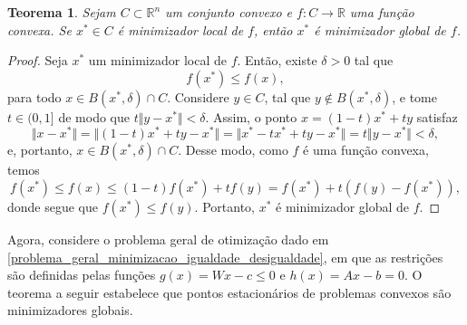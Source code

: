\documentclass[12pt,a4paper]{scrartcl}
\def\RR{\mathds{R}}
\newtheorem{teo}{Teorema}
\theoremstyle{definition}%
\begin{document}
\begin{teo} \label{teo:convexidade_e_minimizador}
Sejam $C \subset \RR^{n}$ um conjunto convexo e $f:C \rightarrow \RR$ uma função convexa. Se $x^{*} \in C$ é minimizador local de $f$, então $x^{*}$ é minimizador global de $f$.
\end{teo}
\begin{proof}
Seja $x^{*}$ um minimizador local de $f$. Então, existe $\delta > 0$ tal que 
\[
f(x^{*}) \leq f(x), 
\]
para todo $x \in B(x^{*}, \delta) \cap C$. Considere $y \in C$, tal que $y \notin B(x^{*}, \delta)$, e tome $t \in (0,1]$ de modo que $t \Vert y-x^{*} \Vert < \delta$. Assim, o ponto $x = (1-t)x^{*} + ty$ satisfaz
\[
\Vert x - x^{*} \Vert = \Vert (1-t)x^{*} + ty - x^{*} \Vert = \Vert x^{*} - tx^{*} + ty - x^{*} \Vert = t \Vert y - x^{*} \Vert < \delta ,
\]
e, portanto, $x \in B(x^{*}, \delta) \cap C$.
Desse modo, como $f$ é uma função convexa, temos
\[
f(x^{*}) \leq f(x) \leq (1-t)f(x^{*}) + tf(y) = f(x^{*}) + t(f(y)-f(x^{*})),
\]
donde segue que $f(x^{*}) \leq f(y)$.
Portanto, $x^{*}$ é minimizador global de $f$.
\end{proof}

Agora, considere o problema geral de otimização dado em \eqref{problema_geral_minimizacao_igualdade_desigualdade}, em que as restrições são definidas pelas funções $g(x) = Wx - c \leq 0$ e $h(x) = Ax - b = 0$. O teorema a seguir estabelece que pontos estacionários de problemas convexos são minimizadores globais.
\end{document}
